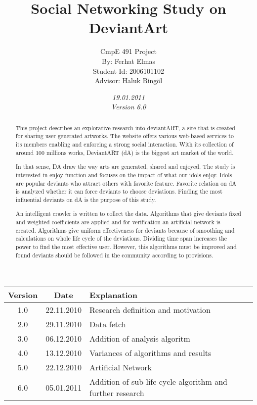 \documentclass[12pt,a4paper]{report}
\title{Social Networking Study on DeviantArt}
\date{\emph{19.01.2011} \\ \emph{Version 6.0} }
\author{CmpE 491 Project\\
By: Ferhat Elmas \\
Student Id: 2006101102\\
Advisor: Haluk Bing\"{o}l
}
\begin{document}

\maketitle

\begin{history}

\begin{table}[htdp]
\begin{center}
\begin{tabular}{|c|c|p{10cm}|}
\hline
\textbf{Version} & \textbf{Date} & \textbf{Explanation} \\
\hline
1.0 & 22.11.2010 & Research definition and motivation \\
\hline
2.0 & 29.11.2010 & Data fetch \\
\hline
3.0 & 06.12.2010 & Addition of analysis algoritm \\
\hline
4.0 & 13.12.2010 & Variances of algorithms and results \\
\hline
5.0 & 22.12.2010 & Artificial Network \\
\hline
6.0 & 05.01.2011 & Addition of sub life cycle algorithm and further research \\
\hline
\end{tabular}
\end{center}
\end{table}


\end{history}

\begin{abstract}
	This project describes an explorative research into deviantART, a site that is created for sharing user generated artworks. The website offers various web-based services to its members enabling and enforcing a strong social interaction. With its collection of around 100 millions works, DeviantART (dA) is the biggest art market of the world.

	In that sense, DA draw the way arts are generated, shared and enjoyed.  The study is interested in enjoy function and focuses on the impact of what our idols enjoy. Idols are popular deviants who attract others with favorite feature. Favorite relation on dA is analyzed whether it can force deviants to choose deviations. Finding the most influential deviants on dA is the purpose of this study.

	An intelligent crawler is written to collect the data. Algorithms that give deviants fixed and weighted coefficients are applied and for verification an artificial network is created.  Algorithms give uniform effectiveness for deviants because of smoothing and calculations on whole life cycle of the deviations. Dividing time span increases the power to find the most effective user. However, this algorithms must be improved and found deviants should be followed in the community according to provisions.
\end{abstract}
\end{document}
